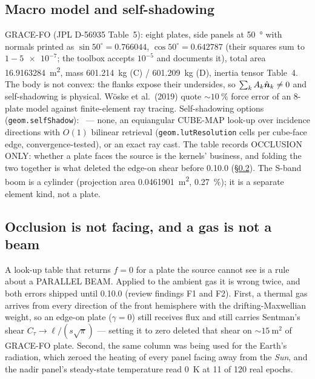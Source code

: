 \subsection{Macro model and self-shadowing}
GRACE-FO (JPL D-56935 Table~5): eight plates, side panels at \SI{50}{\degree} with normals printed as $\sin50^\circ=0.766044$, $\cos50^\circ=0.642787$ (their squares sum to $1-\num{5e-7}$; the toolbox accepts $10^{-5}$ and documents it), total area \SI{16.9163284}{\metre\squared}, mass \SI{601.214}{kg} (C) / \SI{601.209}{kg} (D), inertia tensor Table~4. The body is not convex: the flanks expose their undersides, so $\sum_kA_k\hat{\bm{n}}_k\ne0$ and self-shadowing is physical. Wöske et al.\ (2019) quote $\sim\SI{10}{\percent}$ force error of an 8-plate model against finite-element ray tracing. Self-shadowing options (\texttt{geom.selfShadow}): \ngfoptgeomselfShadow\ --- none, an equiangular CUBE-MAP look-up over incidence directions with $O(1)$ bilinear retrieval (\texttt{geom.lutResolution} cells per cube-face edge, convergence-tested), or an exact ray cast. The table records OCCLUSION ONLY: whether a plate faces the source is the kernels' business, and folding the two together is what deleted the edge-on shear before 0.10.0 (\S\ref{sec:flow}). The S-band boom is a cylinder (projection area \SI{0.0461901}{\metre\squared}, \SI{0.27}{\percent}); it is a separate element kind, not a plate.

\subsection{Occlusion is not facing, and a gas is not a beam}\label{sec:flow}
A look-up table that returns $f=0$ for a plate the source cannot see is a rule about a PARALLEL BEAM.
Applied to the ambient gas it is wrong twice, and both errors shipped until 0.10.0 (review findings
F1 and F2). First, a thermal gas arrives from every direction of the front hemisphere with the
drifting-Maxwellian weight, so an edge-on plate ($\gamma=0$) still receives flux and still carries
Sentman's shear $C_\tau\to\ell/(s\sqrt\pi)$ --- setting it to zero deleted that shear on
$\sim\SI{15}{\metre\squared}$ of GRACE-FO plate. Second, the same column was being used for the
Earth's radiation, which zeroed the heating of every panel facing away from the \emph{Sun}, and the
nadir panel's steady-state temperature read \SI{0}{\kelvin} at 11 of 120 real epochs.

